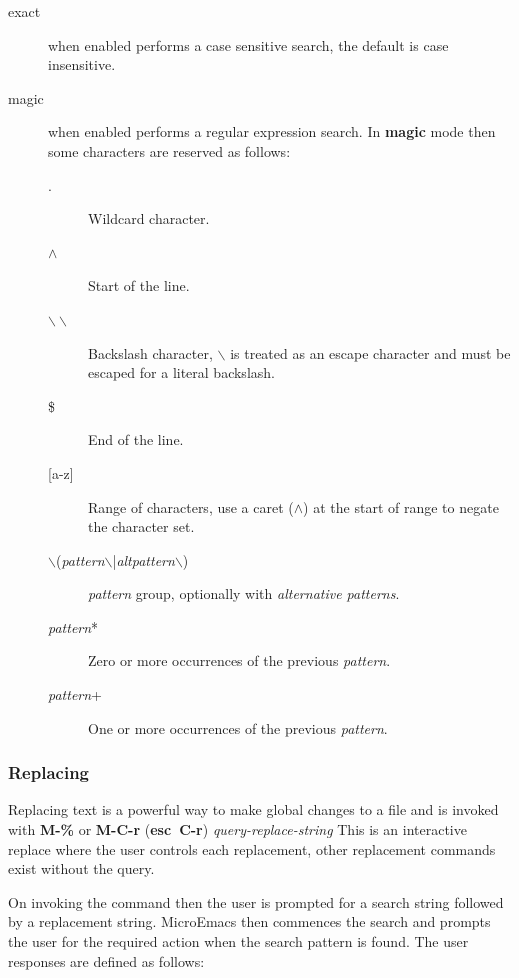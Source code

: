 \documentclass[11pt,a4paper,pdftex]{article}
\begin{document}
  \begin{description}

    \item[exact] when enabled performs a case sensitive search, the default is
    case insensitive.

    \item[magic] when enabled performs a regular expression search. In
    \textbf{magic} mode then some characters are reserved as follows:

      \begin{description}
        \item[.] Wildcard character.
        \item[$\wedge$] Start of the line.
        \item[$\backslash\backslash$] Backslash character, $\backslash$ is
        treated as an escape character and must be escaped for a literal
        backslash.
        \item[\$] End of the line.
        \item[{[}a-z{]}] Range of characters, use a caret ($\wedge$) at the
        start of range to negate the character set.
        \item[$\backslash$(\textit{pattern}$\backslash$|\textit{altpattern}$\backslash$)]
        \textit{pattern} group, optionally with \textit{alternative patterns}.
        \item[\textit{pattern}*] Zero or more occurrences of the previous \textit{pattern}.
        \item[\textit{pattern}+] One or more occurrences of the previous \textit{pattern}.
      \end{description}

  \end{description}

\subsubsection{Replacing}

  Replacing text is a powerful way to make global changes to a file and is
  invoked with \textbf{M-\%} or \textbf{M-C-r} (\textbf{esc~C-r})
  \textit{query-replace-string} This is an interactive replace where the user
  controls each replacement, other replacement commands exist without the
  query.

  On invoking the command then the user is prompted for a search string
  followed by a replacement string. MicroEmacs then commences the search and
  prompts the user for the required action when the search pattern is found.
  The user responses are defined as follows:
\end{document}

